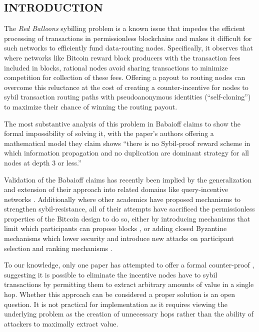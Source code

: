 \documentclass[oneside]{article}   	%
\begin{document}
\begin{multicols}{2}

\subsection*{INTRODUCTION}

The \textit{Red Balloons} sybilling problem is a known issue that impedes the efficient processing of transactions in permissionless blockchains and makes it difficult for such networks to efficiently fund data-routing nodes. Specifically, it observes that where networks like Bitcoin reward block producers with the transaction fees included in blocks, rational nodes avoid sharing transactions to minimize competition for collection of these fees. Offering a payout to routing nodes can overcome this reluctance at the cost of creating a counter-incentive for nodes to sybil transaction routing paths with pseudoanonymous identities (``self-cloning'') to maximize their chance of winning the routing payout.

The most substantive analysis of this problem in Babaioff \cite{Babaioff2011OnBA} claims to show the formal impossibility of solving it, with the paper's authors offering a mathematical model they claim shows ``there is no Sybil-proof reward scheme in which information propagation and no duplication are dominant strategy for all nodes at depth 3 or less.''

Validation of the Babaioff claims has recently been implied by the generalization and extension of their approach into related domains like query-incentive networks \cite{chen2013sybil} \cite{zhang2023collusionproof}. Additionally where other academics have proposed mechanisms to strengthen sybil-resistance, all of their attempts have sacrificed the permissionless properties of the Bitcoin design to do so, either by introducing mechanisms that limit which participants can propose blocks \cite{DBLP:journals/corr/abs-1712-07564}, or adding closed Byzantine mechanisms which lower security and introduce new attacks on participant selection and ranking mechanisms \cite{DBLP:journals/corr/AbrahamMNRS16}.

To our knowledge, only one paper has attempted to offer a formal counter-proof \cite{DBLP:journals/corr/abs-2110-10606}, suggesting it is possible to eliminate the incentive nodes have to sybil transactions by permitting them to extract arbitrary amounts of value in a single hop. Whether this approach can be considered a proper solution is an open question. It is not practical for implementation as it requires viewing the underlying problem as the creation of unnecessary hops rather than the ability of attackers to maximally extract value.


\end{multicols}
\end{document}
